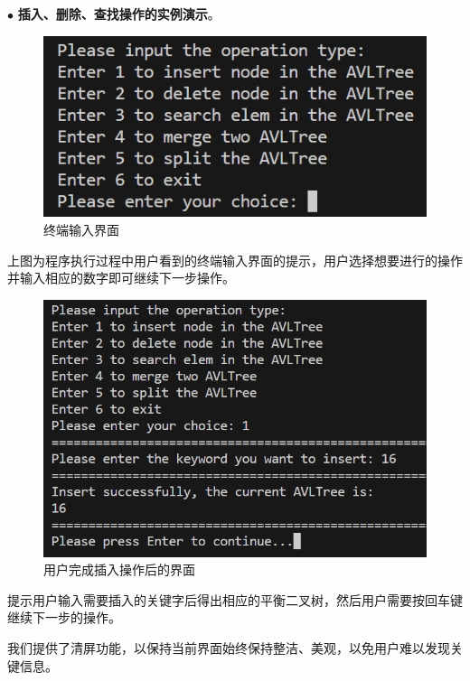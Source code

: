 \noindent
$\bullet$
\textbf{插入、删除、查找操作的实例演示}。

\begin{figure}[H]
  \centering
  \includegraphics[width=13cm]{fig/AVLTree25.png}
  \caption{终端输入界面}
\end{figure}

上图为程序执行过程中用户看到的终端输入界面的提示，用户选择想要进行的操作并输入相应的数字即可继续下一步操作。

\begin{figure}[H]
  \centering
  \includegraphics[width=13cm]{fig/AVLTree16.png}
  \caption{用户完成插入操作后的界面}
\end{figure}

提示用户输入需要插入的关键字后得出相应的平衡二叉树，然后用户需要按回车键继续下一步的操作。

我们提供了清屏功能，以保持当前界面始终保持整洁、美观，以免用户难以发现关键信息。

